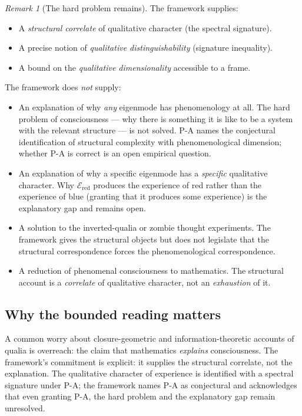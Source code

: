 \documentclass[11pt]{article}
\theoremstyle{plain}
\theoremstyle{definition}
\theoremstyle{remark}
\newtheorem{remark}[theorem]{Remark}
\begin{document}
\begin{remark}[The hard problem remains]\label{rem:qualia-discipline}
The framework supplies:
\begin{itemize}[leftmargin=2em]
\item A \emph{structural correlate} of qualitative character (the spectral signature).
\item A precise notion of \emph{qualitative distinguishability} (signature inequality).
\item A bound on the \emph{qualitative dimensionality} accessible to a frame.
\end{itemize}
The framework does \emph{not} supply:
\begin{itemize}[leftmargin=2em]
\item An explanation of why \emph{any} eigenmode has phenomenology at all. The hard problem of consciousness --- why there is something it is like to be a system with the relevant structure --- is not solved. P-A names the conjectural identification of structural complexity with phenomenological dimension; whether P-A is correct is an open empirical question.
\item An explanation of why a specific eigenmode has a \emph{specific} qualitative character. Why $\mathcal{E}_{\mathrm{red}}$ produces the experience of red rather than the experience of blue (granting that it produces some experience) is the explanatory gap and remains open.
\item A solution to the inverted-qualia or zombie thought experiments. The framework gives the structural objects but does not legislate that the structural correspondence forces the phenomenological correspondence.
\item A reduction of phenomenal consciousness to mathematics. The structural account is a \emph{correlate} of qualitative character, not an \emph{exhaustion} of it.
\end{itemize}
\end{remark}

\subsection{Why the bounded reading matters}

A common worry about closure-geometric and information-theoretic accounts of qualia is overreach: the claim that mathematics \emph{explains} consciousness. The framework's commitment is explicit: it supplies the structural correlate, not the explanation. The qualitative character of experience is identified with a spectral signature under P-A; the framework names P-A as conjectural and acknowledges that even granting P-A, the hard problem and the explanatory gap remain unresolved.
\end{document}
